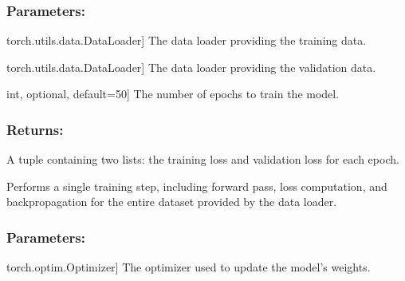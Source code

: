 \documentclass[a4paper,10pt,english]{sphinxmanual}
\begin{document}
\begin{fulllineitems}
\begin{fulllineitems}
\subsubsection{Parameters:}
\label{\detokenize{models:id34}}\begin{description}
\sphinxlineitem{tdataloader}{[}torch.utils.data.DataLoader{]}
\sphinxAtStartPar
The data loader providing the training data.

\sphinxlineitem{vdataloader}{[}torch.utils.data.DataLoader{]}
\sphinxAtStartPar
The data loader providing the validation data.

\sphinxlineitem{epochs}{[}int, optional, default=50{]}
\sphinxAtStartPar
The number of epochs to train the model.

\end{description}


\subsubsection{Returns:}
\label{\detokenize{models:id35}}\begin{description}
\sphinxAtStartPar
A tuple containing two lists: the training loss and validation loss
for each epoch.

\end{description}

\end{fulllineitems}


\begin{fulllineitems}
\label{\detokenize{models:fireDiff.Models.deterministicmodel.PredictionModel.train_step}}
\pysigstartsignatures
{}
\pysigstopsignatures
\sphinxAtStartPar
Performs a single training step, including forward pass, loss
computation, and backpropagation for the entire dataset provided
by the data loader.


\subsubsection{Parameters:}
\label{\detokenize{models:id36}}\begin{description}
\sphinxlineitem{optimizer}{[}torch.optim.Optimizer{]}
\sphinxAtStartPar
The optimizer used to update the model’s weights.


\end{description}
\end{fulllineitems}
\end{fulllineitems}
\end{document}
